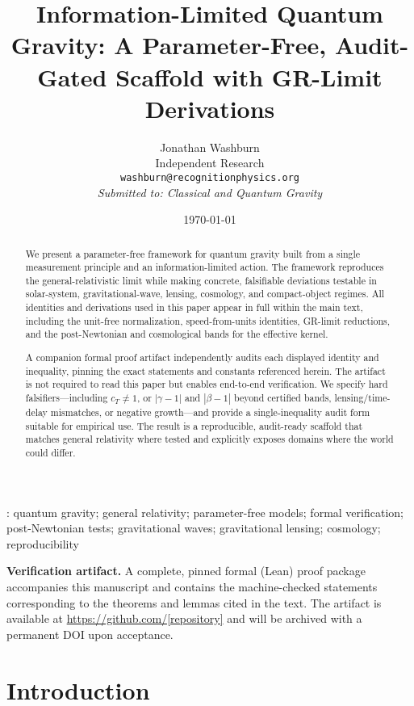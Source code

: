 \documentclass[12pt,a4paper]{article}
\title{Information-Limited Quantum Gravity: A Parameter-Free, Audit-Gated Scaffold with GR-Limit Derivations}
\author{Jonathan Washburn\\
\small Independent Research\\
\small \texttt{washburn@recognitionphysics.org}\\[1ex]
\small \textit{Submitted to: Classical and Quantum Gravity}}
\date{\today}
\begin{document}
\maketitle

\begin{abstract}
We present a parameter-free framework for quantum gravity built from a single measurement principle and an information-limited action. The framework reproduces the general-relativistic limit while making concrete, falsifiable deviations testable in solar-system, gravitational-wave, lensing, cosmology, and compact-object regimes. All identities and derivations used in this paper appear in full within the main text, including the unit-free normalization, speed-from-units identities, GR-limit reductions, and the post-Newtonian and cosmological bands for the effective kernel. 

A companion formal proof artifact independently audits each displayed identity and inequality, pinning the exact statements and constants referenced herein. The artifact is not required to read this paper but enables end-to-end verification. We specify hard falsifiers---including $c_T\neq 1$, or $|\gamma-1|$ and $|\beta-1|$ beyond certified bands, lensing/time-delay mismatches, or negative growth---and provide a single-inequality audit form suitable for empirical use. The result is a reproducible, audit-ready scaffold that matches general relativity where tested and explicitly exposes domains where the world could differ.
\end{abstract}

\vspace{1ex}
: quantum gravity; general relativity; parameter-free models; formal verification; post-Newtonian tests; gravitational waves; gravitational lensing; cosmology; reproducibility

\vspace{2ex}
\noindent\textbf{Verification artifact.} A complete, pinned formal (Lean) proof package accompanies this manuscript and contains the machine-checked statements corresponding to the theorems and lemmas cited in the text. The artifact is available at \url{https://github.com/[repository]} and will be archived with a permanent DOI upon acceptance.


\section{Introduction}
\end{document}
